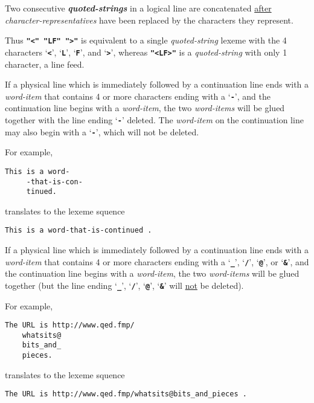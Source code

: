 \documentclass[12pt]{article}
\makeatletter
\newcommand{\TT}[1]{{\tt \bfseries #1}}
\newcommand{\emskey}[2]{{\bf \em #1#2}\index{#1@{\em #1}}}
\newenvironment{indpar}[1][0.3in]%
	{\begin{list}{}%
		     {\setlength{\itemsep}{0in}%
		      \setlength{\topsep}{0in}%
		      \setlength{\parsep}{1ex}%
		      \setlength{\labelwidth}{#1}%
		      \setlength{\leftmargin}{#1}%
		      \addtolength{\leftmargin}{\labelsep}}%
	 \item}%
	{\end{list}}
\makeatother
\begin{document}
\begin{enumerate}
\item Two consecutive \emskey{quoted-string}s in a logical line
are concatenated \underline{after} {\em character-represen\-ta\-tives}
have been replaced by the characters they represent.

Thus \TT{"<" "LF" ">"} is equivalent to a single {\em quoted-string}
lexeme with the 4 characters `\TT{<}', `\TT{L}', `\TT{F}', and
`\TT{>}', whereas \TT{"<LF>"} is a {\em quoted-string} with only
1 character, a line feed.

\label{CONTINUATION-GLUING}
\item
If a physical line which is immediately followed by a continuation line
ends with a {\em word-item} that
contains 4 or more characters ending with a `\TT{-}',
and the continuation line begins with a {\em word-item},
the two {\em word-items}
will be glued together with the line ending `\TT{-}' deleted.
The {\em word-item} on the continuation line may also begin
with a `\TT{-}', which will not be deleted.

For example,

\begin{indpar}\begin{verbatim}
This is a word-
     -that-is-con-
     tinued.
\end{verbatim}\end{indpar}

translates to the lexeme squence

\begin{indpar}\begin{verbatim}
This is a word-that-is-continued .
\end{verbatim}\end{indpar}

\item
If a physical line which is immediately followed by a continuation line
ends with a {\em word-item} that
contains 4 or more characters ending with a `\TT{\_}',
`\TT{/}', `\TT{@}', or `\TT{\&}',
and the continuation line begins with a {\em word-item},
the two {\em word-items}
will be glued together
(but the line ending `\TT{\_}', `\TT{/}', `\TT{@}', `\TT{\&}'
will \underline{not} be deleted).

For example,

\begin{indpar}\begin{verbatim}
The URL is http://www.qed.fmp/
    whatsits@
    bits_and_
    pieces.
\end{verbatim}\end{indpar}

translates to the lexeme squence

\begin{indpar}[0.1in]\begin{verbatim}
The URL is http://www.qed.fmp/whatsits@bits_and_pieces .
\end{verbatim}\end{indpar}

\end{enumerate}
\end{document}
